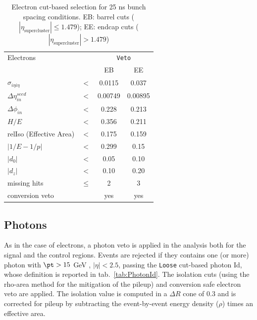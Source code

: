 \begin{table}[htb]
 \centering
    \begin{tabular}{lccc}
     \hline

    Electrons                   &        & \multicolumn{2}{c}{\texttt{Veto}}\\
                                &        & EB      & EE     \\
 \hline
 \hline
    $\sigma_{i\eta i\eta} $     & $ < $  &0.0115   &0.037  \\
    $\Delta \eta_{in}^{seed}$   & $ < $  &0.00749  &0.00895 \\
    $\Delta \phi_{in} $      & $ < $  &0.228    &0.213   \\
    $H/E $                      & $ < $  &0.356    &0.211   \\
    relIso (Effective Area)                 & $<$    &0.175    &0.159   \\
    $|1/E - 1/p|$               & $ < $  &0.299    &0.15    \\
    $|d_0|$                     & $ < $  &0.05     &0.10   \\
    $|d_z|$                     & $ < $  &0.10     &0.20   \\
    missing hits                & $\leq$ &2        &3       \\
    conversion veto             &        &  yes    &yes     \\
    
 \hline
\end{tabular}
\caption{Electron cut-based selection for 25 ns bunch spacing conditions. EB: barrel cuts ( $|\eta_\text{supercluster}| \leq 1.479$); EE: endcap cuts ( $|\eta_\text{supercluster}| > 1.479$)}
\label{tab:EGcutBar}
\end{table}


\subsection{Photons}
As in the case of electrons, a photon veto is applied in the analysis both for the signal and the control regions. Events are rejected if they contains one (or more) photon with $\pt > 15$ GeV , $|\eta| < 2.5$, passing the \texttt{Loose} cut-based photon Id, whose definition is reported in tab.~\ref{tab:PhotonId}. The isolation cuts (using the rho-area method for the mitigation of the pileup) and conversion safe electron veto are applied. The isolation value is computed in a $\Delta R$ cone of 0.3 and is corrected for pileup by subtracting the event-by-event energy density ($\rho$) times an effective area.

